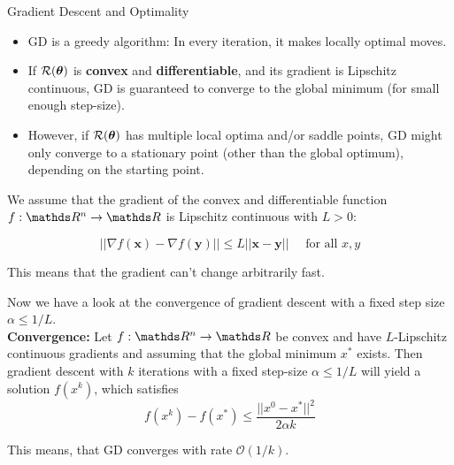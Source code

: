 \begin{vbframe}{Gradient Descent and Optimality}
		
		\begin{minipage}{0.45\textwidth}
			\begin{small}
				\begin{itemize}
					\item GD is a greedy algorithm: In every iteration, it makes locally optimal moves.
					\vspace*{0.5mm}
					\item If $\mathcal{R}(\bm{\theta})$ is \textbf{convex} and \textbf{differentiable}, and its gradient is Lipschitz continuous, GD is guaranteed to converge to the global minimum (for small enough step-size).  
					\vspace*{0.5mm}
					\item However, if $\mathcal{R}(\bm{\theta})$ has multiple local optima and/or saddle points, GD might only converge to a stationary point (other than the global optimum), depending on the starting point. 
				\end{itemize}
			\end{small}
		\end{minipage}\hfill
		\begin{minipage}{0.5\textwidth}
			\begin{figure}
				\centering
			\end{figure}
		\end{minipage}  
		\framebreak
		
			We assume that the gradient of the convex and differentiable function $f: \R^n \rightarrow \R$ is Lipschitz continuous with $L > 0$: 
		
			\begin{equation*}
			|| \nabla f(\bm{x}) - \nabla f(\bm{y}) || \le L ||\bm{x} - \bm{y} || \quad \text{ for all } x, y
			\end{equation*}
			
			This means that the gradient can't change arbitrarily fast. 
			
			\lz 
			
			Now we have a look at the convergence of gradient descent with a fixed step size $\alpha \leq 1/L$. \\
			\textbf{Convergence:} Let $f:\R^n \to \R$ be convex and have $L$-Lipschitz continuous gradients and assuming that the global minimum ${x}^\ast$ exists. Then gradient descent with $k$ iterations with a fixed step-size $\alpha \leq 1/L$ will yield a solution $f(x^k)$, which satisfies
			$$
				f({x}^k) - f({x}^\ast) \leq \frac{|| {x}^0 - {x}^\ast ||^2}{2\alpha k}
			$$
			
			This means, that GD converges with rate $\mathcal{O}(1/k)$.
			\framebreak 
		\end{vbframe}
